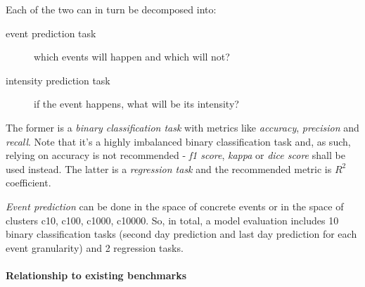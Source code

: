 Each of the two can in turn be decomposed into:
\begin{description}
    \item[event prediction task] which events will happen and which will not?
    \item[intensity prediction task] if the event happens, what will be its intensity?
\end{description}

The former is a \emph{binary classification task} with metrics like \emph{accuracy}, \emph{precision} and \emph{recall}.
Note that it's a highly imbalanced binary classification task and, as such, relying on accuracy is not recommended - \emph{f1 score}, \emph{kappa} or \emph{dice score} shall be used instead.
The latter is a \emph{regression task} and the recommended metric is $R^2$ coefficient.

\emph{Event prediction} can be done in the space of concrete events or in the space of clusters c10, c100, c1000, c10000.
So, in total, a model evaluation includes 10 binary classification tasks (second day prediction and last day prediction for each event granularity) and 2 regression tasks.

\paragraph{Relationship to existing benchmarks}

